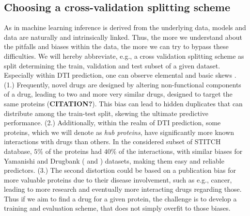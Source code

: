 \documentclass{bioinfo}
\begin{document}
\subsection{Choosing a cross-validation splitting scheme}
As in machine learning inference is derived from the underlying data, models and data are naturally and intrinsically linked. Thus, the more we understand about the pitfalls and biases within the data, the more we can try to bypass these difficulties. We will hereby abbreviate, e.g., a cross validation splitting scheme as \glqq split\grqq{} determining the train, validation and test subset of a given dataset. \\
Especially within DTI prediction, one can observe elemental and basic skews \citep{Pahikkala2014}. (1.) Frequently, novel drugs are designed by altering non-functional components of a drug, leading to two and more very similar drugs, designed to target the same proteins (\textbf{CITATION?}). This bias can lead to \glqq hidden duplicates\grqq{} that can distribute among the train-test split, skewing the ultimate predictive performance. (2.) Additionally, within the realm of DTI prediction, some proteins, which we will denote as \textit{hub proteins}, have significantly more known interactions with drugs than others. In the considered subset of STITCH database, $5\%$ of the proteins had $40\%$ of the interactions, with similar biases for Yamanishi and Drugbank (\citet{Drugbank2007} and \citet{Drugbank2017}) datasets, making them easy and reliable predictors. (3.) The second distortion could be based on a publication bias for more \glqq valuable\grqq{} proteins due to their disease involvement, such as e.g., cancer, leading to more research and eventually more interacting drugs regarding those. Thus if we aim to find a drug for a given protein, the challenge is to develop a training and evaluation scheme, that does not simply overfit to those biases.\\
\end{document}
